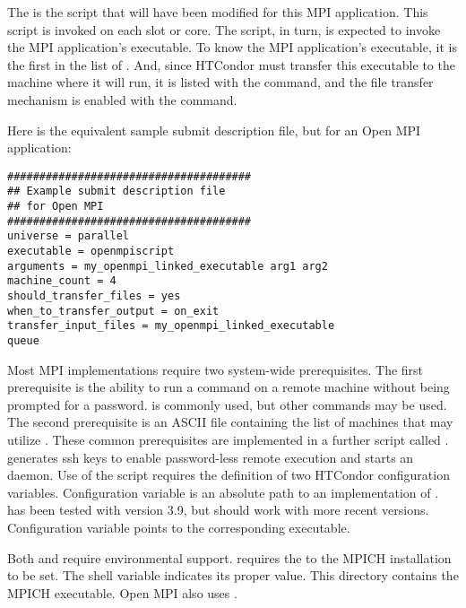 The  is the  script that will have been
modified for this MPI application.
This script is invoked on each slot or core.
The script, in turn, is expected to invoke the MPI application's executable.
To know the MPI application's executable,
it is the first in the list of .
And, since HTCondor must transfer this executable to the machine where
it will run,
it is listed with the  command,
and the file transfer mechanism is enabled with
the  command.

Here is the equivalent sample submit description file,
but for an Open MPI application:

\footnotesize
\begin{verbatim}
######################################
## Example submit description file
## for Open MPI
######################################
universe = parallel
executable = openmpiscript
arguments = my_openmpi_linked_executable arg1 arg2
machine_count = 4
should_transfer_files = yes
when_to_transfer_output = on_exit
transfer_input_files = my_openmpi_linked_executable
queue
\end{verbatim}
\normalsize

Most MPI implementations require two system-wide prerequisites.
The first prerequisite is the ability to run a command
on a remote machine without being prompted for a password.
 is commonly used, but other commands may be used.
The second prerequisite is an ASCII file containing the
list of machines that may utilize .
These common prerequisites are implemented in a further script
called .
 generates ssh keys to enable password-less remote execution
and starts an  daemon.
Use of the  script requires the definition of
two HTCondor configuration variables.
Configuration variable  is an absolute path to
an implementation of .
 has been tested with  version 3.9,
but should work with more recent versions.
Configuration variable  points
to the corresponding  executable.

Both  and 
require environmental support.
 requires the  to the MPICH installation to be set.
The shell variable  indicates its proper value.
This directory contains the MPICH  executable.
Open MPI also uses .

